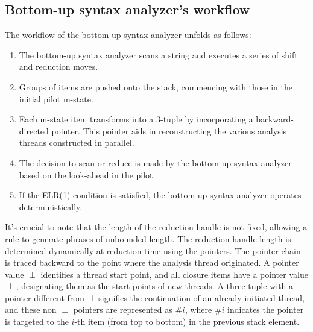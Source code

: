 \subsection{Bottom-up syntax analyzer's workflow}
The workflow of the bottom-up syntax analyzer unfolds as follows:
\begin{enumerate}
    \item The bottom-up syntax analyzer scans a string and executes a series of shift and reduction moves.
    \item Groups of items are pushed onto the stack, commencing with those in the initial pilot m-state.
    \item Each m-state item transforms into a 3-tuple by incorporating a backward-directed pointer. 
        This pointer aids in reconstructing the various analysis threads constructed in parallel.
    \item The decision to scan or reduce is made by the bottom-up syntax analyzer based on the look-ahead in the pilot.
    \item If the ELR(1) condition is satisfied, the bottom-up syntax analyzer operates deterministically.
\end{enumerate}
It's crucial to note that the length of the reduction handle is not fixed, allowing a rule to generate phrases of unbounded length. 
The reduction handle length is determined dynamically at reduction time using the pointers. 
The pointer chain is traced backward to the point where the analysis thread originated. 
A pointer value $\perp$ identifies a thread start point, and all closure items have a pointer value $\perp$, designating them as the start points of new threads.
A three-tuple with a pointer different from $\perp$signifies the continuation of an already initiated thread, and these non $\perp$ pointers are represented as $\#i$, where $\#i$ indicates the pointer is targeted to the $i$-th item (from top to bottom) in the previous stack element.

